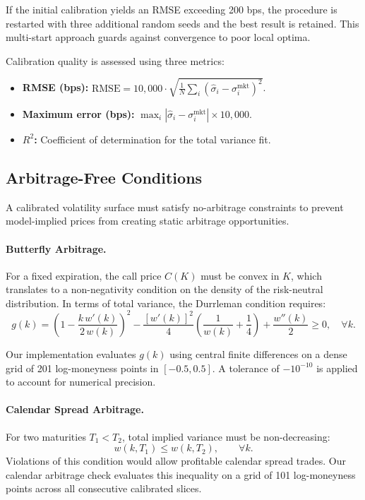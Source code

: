 \documentclass[11pt,a4paper]{article}
\begin{document}
If the initial calibration yields an RMSE exceeding 200 bps, the procedure is restarted with three additional random seeds and the best result is retained. This multi-start approach guards against convergence to poor local optima.

Calibration quality is assessed using three metrics:
\begin{itemize}[nosep]
    \item \textbf{RMSE (bps):} $\text{RMSE} = 10{,}000 \cdot \sqrt{\frac{1}{N}\sum_i (\hat{\sigma}_i - \sigma_i^{\text{mkt}})^2}$.
    \item \textbf{Maximum error (bps):} $\max_i |\hat{\sigma}_i - \sigma_i^{\text{mkt}}| \times 10{,}000$.
    \item \textbf{$R^2$:} Coefficient of determination for the total variance fit.
\end{itemize}


\subsection{Arbitrage-Free Conditions}\label{subsec:arbitrage}

A calibrated volatility surface must satisfy no-arbitrage constraints to prevent model-implied prices from creating static arbitrage opportunities.

\paragraph{Butterfly Arbitrage.}
For a fixed expiration, the call price $C(K)$ must be convex in $K$, which translates to a non-negativity condition on the density of the risk-neutral distribution. In terms of total variance, the Durrleman condition requires:
\begin{equation}\label{eq:butterfly}
    g(k) = \left(1 - \frac{k \, w'(k)}{2 \, w(k)}\right)^2 - \frac{[w'(k)]^2}{4} \left(\frac{1}{w(k)} + \frac{1}{4}\right) + \frac{w''(k)}{2} \geq 0, \quad \forall k.
\end{equation}

Our implementation evaluates $g(k)$ using central finite differences on a dense grid of 201 log-moneyness points in $[-0.5, 0.5]$. A tolerance of $-10^{-10}$ is applied to account for numerical precision.

\paragraph{Calendar Spread Arbitrage.}
For two maturities $T_1 < T_2$, total implied variance must be non-decreasing:
\begin{equation}\label{eq:calendar}
    w(k, T_1) \leq w(k, T_2), \qquad \forall k.
\end{equation}
Violations of this condition would allow profitable calendar spread trades. Our calendar arbitrage check evaluates this inequality on a grid of 101 log-moneyness points across all consecutive calibrated slices.
\end{document}
